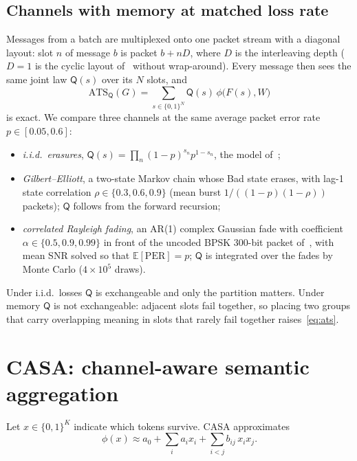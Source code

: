 \documentclass[journal,onecolumn,11pt,draftclsnofoot]{IEEEtran}
\newcommand{\ATS}{\mathrm{ATS}}
\newcommand{\E}{\mathbb{E}}
\newcommand{\Q}{\mathsf{Q}}
\begin{document}
\subsection{Channels with memory at matched loss rate}
Messages from a batch are multiplexed onto one packet stream with a diagonal layout: slot $n$ of message $b$ is packet $b+nD$, where $D$ is the interleaving depth ($D=1$ is the cyclic layout of~\cite{lee2026look} without wrap-around). Every message then sees the same joint law $\Q(s)$ over its $N$ slots, and
\begin{equation}
\ATS_\Q(G)=\sum_{s\in\{0,1\}^N}\Q(s)\,\phi\big(F(s),W\big)
\label{eq:ats}
\end{equation}
is exact. We compare three channels at the same average packet error rate $p\in[0.05,0.6]$:
\begin{itemize}
\item \emph{i.i.d.\ erasures}, $\Q(s)=\prod_n(1-p)^{s_n}p^{1-s_n}$, the model of~\cite{lee2025gbeam,lee2026look};
\item \emph{Gilbert--Elliott}, a two-state Markov chain whose Bad state erases, with lag-1 state correlation $\rho\in\{0.3,0.6,0.9\}$ (mean burst $1/((1-p)(1-\rho))$ packets); $\Q$ follows from the forward recursion;
\item \emph{correlated Rayleigh fading}, an AR(1) complex Gaussian fade with coefficient $\alpha\in\{0.5,0.9,0.99\}$ in front of the uncoded BPSK 300-bit packet of~\cite{lee2026look}, with mean SNR solved so that $\E[\mathrm{PER}]=p$; $\Q$ is integrated over the fades by Monte Carlo ($4\times10^5$ draws).
\end{itemize}
Under i.i.d.\ losses $\Q$ is exchangeable and only the partition matters. Under memory $\Q$ is not exchangeable: adjacent slots fail together, so placing two groups that carry overlapping meaning in slots that rarely fail together raises~\eqref{eq:ats}.

\section{CASA: channel-aware semantic aggregation}
\label{sec:method}

Let $x\in\{0,1\}^K$ indicate which tokens survive. CASA approximates
\begin{equation}
\phi(x)\approx a_0+\sum_i a_i x_i+\sum_{i<j} b_{ij}\,x_i x_j .
\label{eq:surrogate}
\end{equation}
\end{document}
